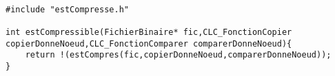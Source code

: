 \begin{verbatim}

#include "estCompresse.h"

int estCompressible(FichierBinaire* fic,CLC_FonctionCopier copierDonneNoeud,CLC_FonctionComparer comparerDonneNoeud){
	return !(estCompres(fic,copierDonneNoeud,comparerDonneNoeud));
}
\end{verbatim}
 
